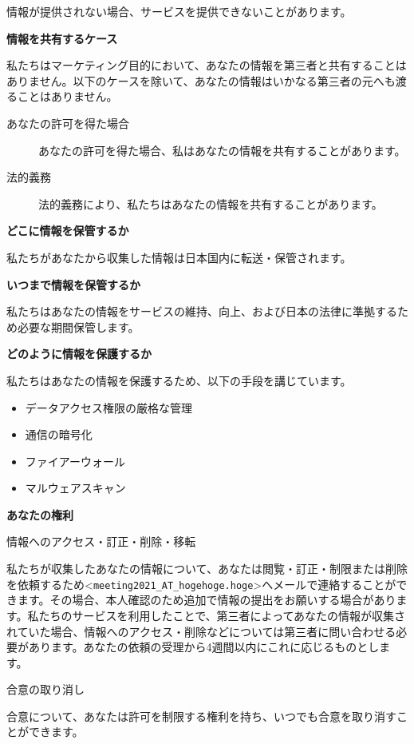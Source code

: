\documentclass[titlepage,10pt,a4paper,uplatex]{jsbook}
\newenvironment{content}{\begin{shaded}\vspace{-1em}\raggedright\ttfamily\footnotesize\setlength{\baselineskip}{1.4em}}{\end{shaded}\vspace{-1em}}
\renewcommand{\textbf}[1]{{\bfseries\sffamily#1}}
\begin{document}
\begin{content}
情報が提供されない場合、サービスを提供できないことがあります。

\textbf{\Large 情報を共有するケース}

私たちはマーケティング目的において、あなたの情報を第三者と共有することはありません。以下のケースを除いて、あなたの情報はいかなる第三者の元へも渡ることはありません。

\begin{description}
\item[あなたの許可を得た場合] あなたの許可を得た場合、私はあなたの情報を共有することがあります。
\item[法的義務] 法的義務により、私たちはあなたの情報を共有することがあります。
\end{description}

\textbf{\Large どこに情報を保管するか}

私たちがあなたから収集した情報は日本国内に転送・保管されます。

\textbf{\Large いつまで情報を保管するか}

私たちはあなたの情報をサービスの維持、向上、および日本の法律に準拠するため必要な期間保管します。

\textbf{\Large どのように情報を保護するか}

私たちはあなたの情報を保護するため、以下の手段を講じています。

\begin{itemize}
\item データアクセス権限の厳格な管理
\item 通信の暗号化
\item ファイアーウォール
\item マルウェアスキャン
\end{itemize}

\textbf{\Large あなたの権利}

{\Large 情報へのアクセス・訂正・削除・移転}

私たちが収集したあなたの情報について、あなたは閲覧・訂正・制限または削除を依頼するため{\textless}\texttt{meeting2021\_AT\_hogehoge.hoge}{\textgreater}へメールで連絡することができます。その場合、本人確認のため追加で情報の提出をお願いする場合があります。私たちのサービスを利用したことで、第三者によってあなたの情報が収集されていた場合、情報へのアクセス・削除などについては第三者に問い合わせる必要があります。あなたの依頼の受理から4週間以内にこれに応じるものとします。

{\Large 合意の取り消し}

合意について、あなたは許可を制限する権利を持ち、いつでも合意を取り消すことができます。


\end{content}
\end{document}
